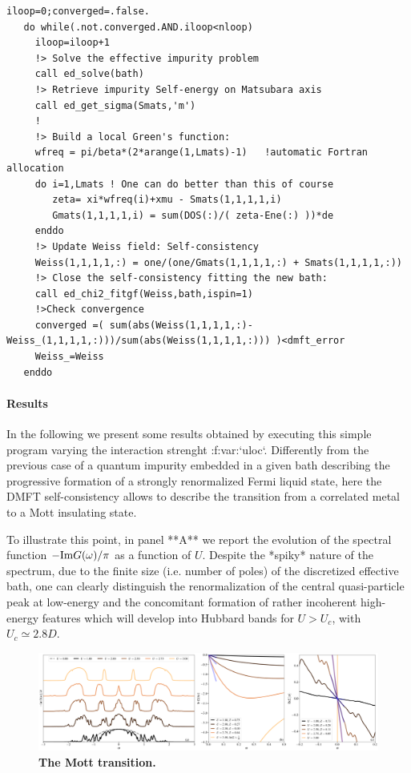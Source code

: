 \begin{lstlisting}[style=fstyle,numbers=none,basicstyle={\scriptsize\ttfamily}]
iloop=0;converged=.false.
   do while(.not.converged.AND.iloop<nloop)
     iloop=iloop+1     
     !> Solve the effective impurity problem
     call ed_solve(bath)     
     !> Retrieve impurity Self-energy on Matsubara axis
     call ed_get_sigma(Smats,'m')
     !
     !> Build a local Green's function:
     wfreq = pi/beta*(2*arange(1,Lmats)-1)   !automatic Fortran allocation
     do i=1,Lmats ! One can do better than this of course 
        zeta= xi*wfreq(i)+xmu - Smats(1,1,1,1,i)
        Gmats(1,1,1,1,i) = sum(DOS(:)/( zeta-Ene(:) ))*de  
     enddo
     !> Update Weiss field: Self-consistency
     Weiss(1,1,1,1,:) = one/(one/Gmats(1,1,1,1,:) + Smats(1,1,1,1,:))
     !> Close the self-consistency fitting the new bath:
     call ed_chi2_fitgf(Weiss,bath,ispin=1)     
     !>Check convergence
     converged =( sum(abs(Weiss(1,1,1,1,:)-Weiss_(1,1,1,1,:)))/sum(abs(Weiss(1,1,1,1,:))) )<dmft_error
     Weiss_=Weiss     
   enddo
\end{lstlisting}


\paragraph{Results}
In the following we present some results obtained by executing this
simple program varying the interaction strenght :f:var:`uloc`.
Differently from the previous case of a quantum impurity embedded in a
given bath describing the progressive formation of a
strongly renormalized Fermi liquid state, here the DMFT
self-consistency allows to describe the transition from a correlated
metal to a Mott insulating state.


To illustrate this point, in panel **A** we report the evolution of
the spectral function $-{\rm Im}G(\omega)/\pi$ as a function of
$U$. Despite the *spiky* nature of the spectrum, due to the
finite size (i.e. number of poles) of the discretized effective bath,
one can clearly distinguish the renormalization of the central
quasi-particle peak at low-energy and the concomitant formation of
rather incoherent  high-energy features which will develop into
Hubbard bands for $U>U_c$, with $U_c\simeq 2.8D$. 


\begin{figure}[t!]
  \includegraphics[width=\linewidth]{figures/figBethe.pdf}
    \caption{\label{fig1}%
        \textbf{The Mott transition.}
        }
\end{figure}



